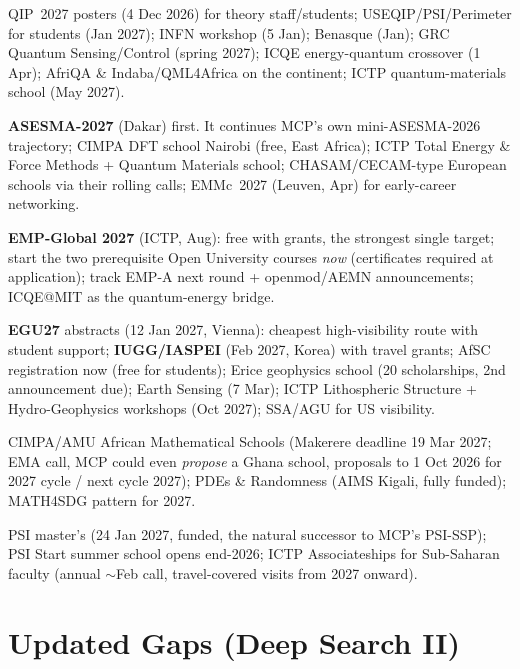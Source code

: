 \documentclass[11pt,a4paper]{article}
\begin{document}
\begin{description}[leftmargin=1.4em,style=nextline]
  \item[Quantum Science \& Technology] QIP~2027 posters (4 Dec 2026) for theory staff/students; USEQIP/PSI/Perimeter for students (Jan 2027); INFN workshop (5 Jan); Benasque (Jan); GRC Quantum Sensing/Control (spring 2027); ICQE energy-quantum crossover (1 Apr); AfriQA \& Indaba/QML4Africa on the continent; ICTP quantum-materials school (May 2027).
  \item[Materials Modelling] \textbf{ASESMA-2027} (Dakar) first. It continues MCP's own mini-ASESMA-2026 trajectory; CIMPA DFT school Nairobi (free, East Africa); ICTP Total Energy \& Force Methods + Quantum Materials school; CHASAM/CECAM-type European schools via their rolling calls; EMMc~2027 (Leuven, Apr) for early-career networking.
  \item[Smart Renewable Energy] \textbf{EMP-Global 2027} (ICTP, Aug): free with grants, the strongest single target; start the two prerequisite Open University courses \emph{now} (certificates required at application); track EMP-A next round + openmod/AEMN announcements; ICQE@MIT as the quantum-energy bridge.
  \item[Computational Seismology / Hydro-Geology] \textbf{EGU27} abstracts (12 Jan 2027, Vienna): cheapest high-visibility route with student support; \textbf{IUGG/IASPEI} (Feb 2027, Korea) with travel grants; AfSC registration now (free for students); Erice geophysics school (20 scholarships, 2nd announcement due); Earth Sensing (7 Mar); ICTP Lithospheric Structure + Hydro-Geophysics workshops (Oct 2027); SSA/AGU for US visibility.
  \item[RealMaths / Applied Mathematics] CIMPA/AMU African Mathematical Schools (Makerere deadline 19 Mar 2027; EMA call, MCP could even \emph{propose} a Ghana school, proposals to 1 Oct 2026 for 2027 cycle / next cycle 2027); PDEs \& Randomness (AIMS Kigali, fully funded); MATH4SDG pattern for 2027.
  \item[Career / degree-level feeders] PSI master's (24 Jan 2027, funded, the natural successor to MCP's PSI-SSP); PSI Start summer school opens end-2026; ICTP Associateships for Sub-Saharan faculty (annual $\sim$Feb call, travel-covered visits from 2027 onward).
\end{description}

\section{Updated Gaps (Deep Search II)}
\end{document}
